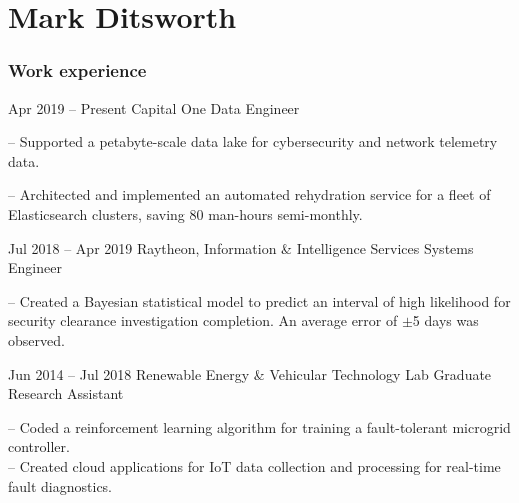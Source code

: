 \documentclass{tccv}
\begin{document}
\part{Mark Ditsworth}

\section{Work experience}

\begin{eventlist}

\item{Apr 2019 -- Present}
    {Capital One}
    {Data Engineer}
    
-- Supported a petabyte-scale data lake for cybersecurity and network telemetry data.

-- Architected and implemented an automated rehydration service for a fleet of Elasticsearch clusters, saving 80 man-hours semi-monthly.

\item{Jul 2018 -- Apr 2019}
    {Raytheon, Information \& Intelligence Services}
    {Systems Engineer}
    
-- Created a Bayesian statistical model to predict an interval of high
likelihood for security clearance investigation completion. An average
error of $\pm$5 days was observed.

\item{Jun 2014 -- Jul 2018}
     {Renewable Energy \& Vehicular Technology Lab}
     {Graduate Research Assistant}

-- Coded a reinforcement learning algorithm for training a fault-tolerant
microgrid controller.\\
-- Created cloud applications for IoT data collection
and processing for real-time fault diagnostics.\\

%

\end{eventlist}
\vspace{-12pt}
\end{document}
